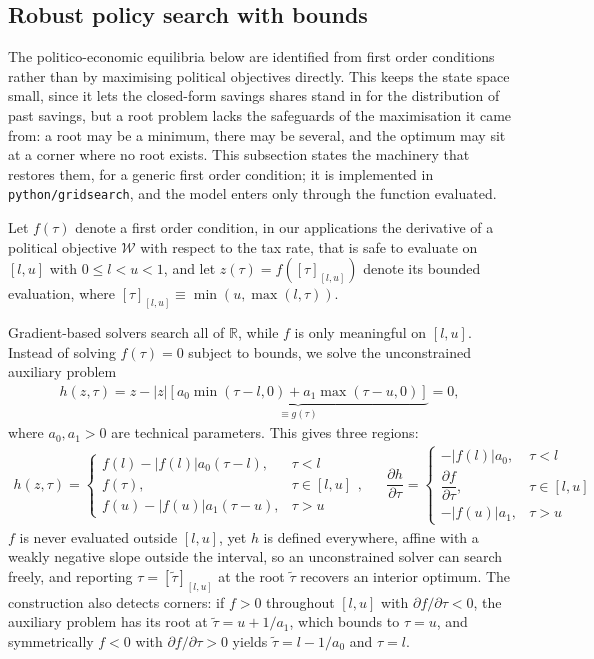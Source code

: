 \subsection{Robust policy search with bounds}\label{\refsec:RobustRoot}
The politico-economic equilibria below are identified from first order conditions rather than by maximising political objectives directly. This keeps the state space small, since it lets the closed-form savings shares stand in for the distribution of past savings, but a root problem lacks the safeguards of the maximisation it came from: a root may be a minimum, there may be several, and the optimum may sit at a corner where no root exists. This subsection states the machinery that restores them, for a generic first order condition; it is implemented in \texttt{python/gridsearch}, and the model enters only through the function evaluated.

Let $f(\tau)$ denote a first order condition, in our applications the derivative of a political objective $\mathcal{W}$ with respect to the tax rate, that is safe to evaluate on $[l,u]$ with $0\leq l < u < 1$, and let $z(\tau) = f\left([\tau]_{[l,u]}\right)$ denote its bounded evaluation, where $[\tau]_{[l,u]} \equiv \min(u, \max(l,\tau))$.

Gradient-based solvers search all of $\mathbb{R}$, while $f$ is only meaningful on $[l,u]$. Instead of solving $f(\tau) = 0$ subject to bounds, we solve the unconstrained auxiliary problem
\begin{align}\label{\refeq:root}
    h(z,\tau) = z - |z| \underbrace{\left[a_0\min\left(\tau - l,0\right) + a_1\max\left(\tau - u, 0\right)\right]}_{\equiv g(\tau)} = 0,
\end{align}
where $a_0, a_1>0$ are technical parameters. This gives three regions:
\begin{align*}
    h\left(z,\tau\right) = \left\lbrace \begin{array}{ll} f(l)-|f(l)| a_0 (\tau - l), & \tau<l \\
    f(\tau), & \tau\in[l,u] \\
    f(u)-|f(u)|a_1(\tau-u), & \tau>u\end{array}\right., && \dfrac{\partial h}{\partial \tau} = \left\lbrace \begin{array}{ll} -|f(l)|a_0, & \tau<l \\
    \dfrac{\partial f}{\partial \tau}, & \tau\in[l,u] \\
    -|f(u)|a_1, & \tau>u\end{array}\right.
\end{align*}
$f$ is never evaluated outside $[l,u]$, yet $h$ is defined everywhere, affine with a weakly negative slope outside the interval, so an unconstrained solver can search freely, and reporting $\tau = [\tilde{\tau}]_{[l,u]}$ at the root $\tilde{\tau}$ recovers an interior optimum. The construction also detects corners: if $f>0$ throughout $[l,u]$ with $\partial f/\partial\tau <0$, the auxiliary problem has its root at $\tilde{\tau} = u+1/a_1$, which bounds to $\tau = u$, and symmetrically $f<0$ with $\partial f/\partial \tau>0$ yields $\tilde{\tau} = l-1/a_0$ and $\tau = l$.


